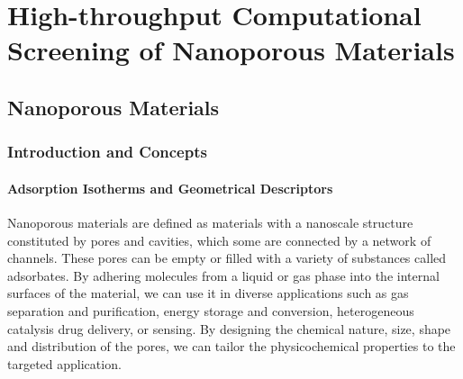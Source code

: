 \documentclass[main.tex]{subfiles}
\begin{document}
\chapter{High-throughput Computational Screening of Nanoporous Materials}
\vspace*{-1\baselineskip}

\section{Nanoporous Materials}

\subsection{Introduction and Concepts}

\subsubsection{Adsorption Isotherms and Geometrical Descriptors}

Nanoporous materials are defined as materials with a nanoscale structure constituted by pores and cavities, which some are connected by a network of channels. These pores can be empty or filled with a variety of substances called adsorbates. By adhering molecules from a liquid or gas phase into the internal surfaces of the material, we can use it in diverse applications such as gas separation and purification,\cite{Li_2009,Lagorsse_2007} energy storage and conversion,\cite{Morris_2008,Qiu_2020} heterogeneous catalysis\cite{Bell_2003,Singh_2019,Pascanu_2019} drug delivery,\cite{Della_Rocca_2011,Bernini_2014} or sensing.\cite{Breslin_1976} By designing the chemical nature, size, shape and distribution of the pores, we can tailor the physicochemical properties to the targeted application.\cite{Yan_2020}
\end{document}
